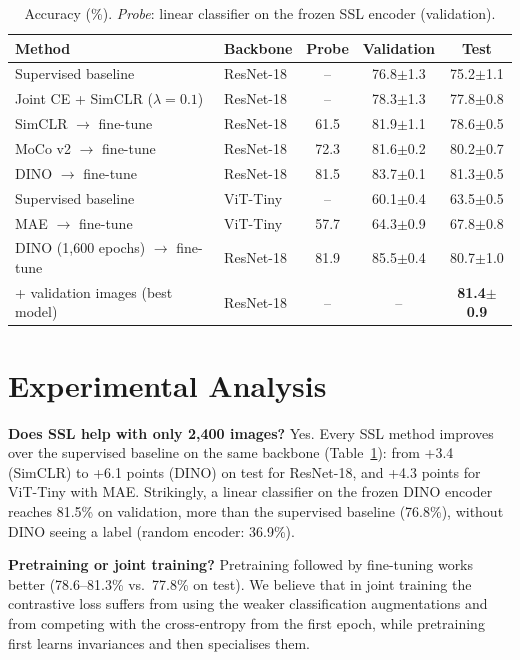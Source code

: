 \documentclass{article}
\begin{document}
\begin{table}[t]
\centering
\small
\caption{Accuracy (\%). \emph{Probe}: linear classifier on the frozen SSL encoder (validation).}
\label{tab:main}
\begin{tabular}{llccc}
\toprule
Method & Backbone & Probe & Validation & Test \\
\midrule
Supervised baseline & ResNet-18 & -- & 76.8$\pm$1.3 & 75.2$\pm$1.1 \\
Joint CE + SimCLR ($\lambda=0.1$) & ResNet-18 & -- & 78.3$\pm$1.3 & 77.8$\pm$0.8 \\
SimCLR $\rightarrow$ fine-tune & ResNet-18 & 61.5 & 81.9$\pm$1.1 & 78.6$\pm$0.5 \\
MoCo v2 $\rightarrow$ fine-tune & ResNet-18 & 72.3 & 81.6$\pm$0.2 & 80.2$\pm$0.7 \\
DINO $\rightarrow$ fine-tune & ResNet-18 & 81.5 & 83.7$\pm$0.1 & 81.3$\pm$0.5 \\
\midrule
Supervised baseline & ViT-Tiny & -- & 60.1$\pm$0.4 & 63.5$\pm$0.5 \\
MAE $\rightarrow$ fine-tune & ViT-Tiny & 57.7 & 64.3$\pm$0.9 & 67.8$\pm$0.8 \\
\midrule
DINO (1,600 epochs) $\rightarrow$ fine-tune & ResNet-18 & 81.9 & 85.5$\pm$0.4 & 80.7$\pm$1.0 \\
\quad + validation images (best model) & ResNet-18 & -- & -- & \textbf{81.4$\pm$0.9} \\
\bottomrule
\end{tabular}
\end{table}

\section{Experimental Analysis}
\label{sec:analysis}

\textbf{Does SSL help with only 2,400 images?} Yes. Every SSL method improves over the supervised baseline on the same backbone (Table~\ref{tab:main}): from +3.4 (SimCLR) to +6.1 points (DINO) on test for ResNet-18, and +4.3 points for ViT-Tiny with MAE. Strikingly, a linear classifier on the frozen DINO encoder reaches 81.5\% on validation, more than the supervised baseline (76.8\%), without DINO seeing a label (random encoder: 36.9\%).

\textbf{Pretraining or joint training?} Pretraining followed by fine-tuning works better (78.6--81.3\% vs.\ 77.8\% on test). We believe that in joint training the contrastive loss suffers from using the weaker classification augmentations and from competing with the cross-entropy from the first epoch, while pretraining first learns invariances and then specialises them.
\end{document}
